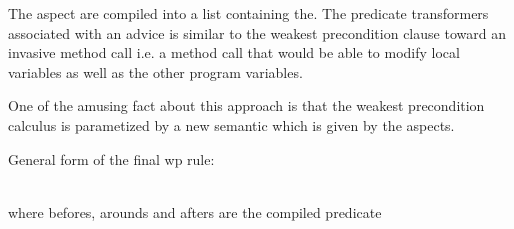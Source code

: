 The aspect are compiled into a list containing the.  The predicate
transformers associated with an advice is similar to the weakest
precondition clause toward an invasive method call i.e. a method call
that would be able to modify local variables as well as the other
program variables.

One of the amusing fact about this approach is that the weakest
precondition calculus is parametized by a new semantic which is given
by the aspects.

General form of the final wp rule: 
\bcode

\\
\ecode
where befores, arounds and afters are the compiled predicate
